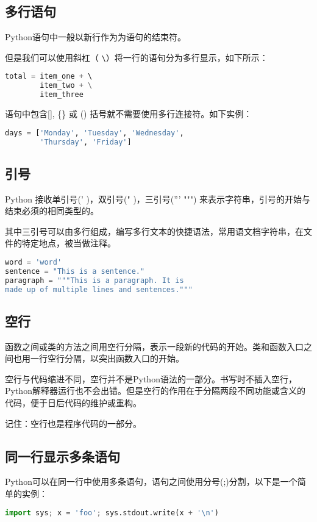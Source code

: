 \subsection{多行语句}
Python语句中一般以新行作为为语句的结束符。

但是我们可以使用斜杠（ \verb|\|）将一行的语句分为多行显示，如下所示：
\begin{lstlisting}[language=Python]
 total = item_one + \ 
        item_two + \
        item_three
\end{lstlisting}

语句中包含[], \{\} 或 () 括号就不需要使用多行连接符。如下实例：
\begin{lstlisting}[language=Python]
days = ['Monday', 'Tuesday', 'Wednesday',
        'Thursday', 'Friday']
\end{lstlisting}



\subsection{引号}
Python 接收单引号(' )，双引号(" )，三引号(''' """) 来表示字符串，引号的开始与结束必须的相同类型的。

其中三引号可以由多行组成，编写多行文本的快捷语法，常用语文档字符串，在文件的特定地点，被当做注释。
\begin{lstlisting}[language=Python]
word = 'word'
sentence = "This is a sentence."
paragraph = """This is a paragraph. It is
made up of multiple lines and sentences."""
\end{lstlisting}



\subsection{空行}
函数之间或类的方法之间用空行分隔，表示一段新的代码的开始。类和函数入口之间也用一行空行分隔，以突出函数入口的开始。

空行与代码缩进不同，空行并不是Python语法的一部分。书写时不插入空行，Python解释器运行也不会出错。但是空行的作用在于分隔两段不同功能或含义的代码，便于日后代码的维护或重构。

记住：空行也是程序代码的一部分。



\subsection{同一行显示多条语句}
Python可以在同一行中使用多条语句，语句之间使用分号(;)分割，以下是一个简单的实例：
\begin{lstlisting}[language=Python]
import sys; x = 'foo'; sys.stdout.write(x + '\n')
\end{lstlisting}



